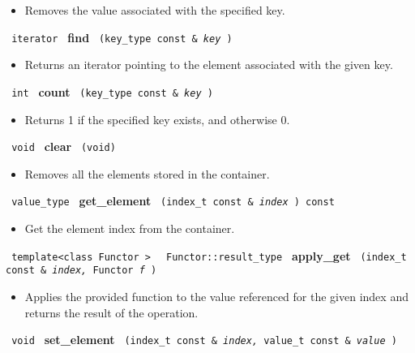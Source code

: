 \begin{itemize}
\item
Removes the value associated with the specified key.
\end{itemize}

\noindent
\texttt{%
iterator
}
\newline
\textbf{find}%
\texttt{%
(key\_type const \&
\textit{key}%
)
}

\begin{itemize}
\item
Returns an iterator pointing to the element associated with the given key.
\end{itemize}

\noindent
\texttt{%
int
}
\newline
\textbf{count}%
\texttt{%
(key\_type const \&
\textit{key}%
)
}

\begin{itemize}
\item
Returns 1 if the specified key exists, and otherwise 0.
\end{itemize}

\noindent
\texttt{%
void
}
\newline
\textbf{clear}%
\texttt{%
(void)
}

\begin{itemize}
\item
Removes all the elements stored in the container.
\end{itemize}

\noindent
\texttt{%
value\_type
}
\newline
\textbf{get\_element}%
\texttt{%
(index\_t const \&
\textit{index}%
) const
}

\begin{itemize}
\item
Get the element index from the container.
\end{itemize}

\noindent
\texttt{%
template<class Functor >
}
\texttt{%
Functor::result\_type
}
\newline
\textbf{apply\_get}%
\texttt{%
(index\_t const \&
\textit{index,}%
Functor
\textit{f}%
)
}

\begin{itemize}
\item
Applies the provided function to the value referenced for the given index and returns the result of the operation.
\end{itemize}

\noindent
\texttt{%
void
}
\newline
\textbf{set\_element}%
\texttt{%
(index\_t const \&
\textit{index,}%
value\_t const \&
\textit{value}%
)
}


